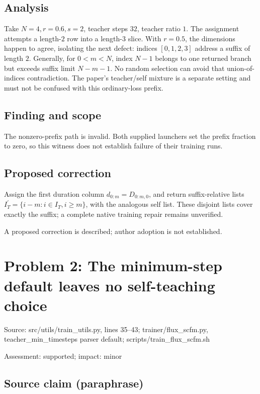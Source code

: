\documentclass[11pt]{article}
\begin{document}
\subsection*{Analysis}

Take \(N=4,r=0.6,s=2\), teacher steps \(32\), teacher ratio \(1\). The assignment attempts a length-\(2\) row into a length-\(3\) slice. With \(r=0.5\), the dimensions happen to agree, isolating the next defect: indices \([0,1,2,3]\) address a suffix of length \(2\). Generally, for \(0<m<N\), index \(N-1\) belongs to one returned branch but exceeds suffix limit \(N-m-1\). No random selection can avoid that union-of-indices contradiction. The paper’s teacher/self mixture is a separate setting and must not be confused with this ordinary-loss prefix.

\subsection*{Finding and scope}

The nonzero-prefix path is invalid. Both supplied launchers set the prefix fraction to zero, so this witness does not establish failure of their training runs.

\subsection*{Proposed correction}

Assign the first duration column \(d_{0:m}=D_{0:m,0}\), and return suffix-relative lists \(I_T^{\prime}=\{i-m:i\in I_T,i\ge m\}\), with the analogous self list. These disjoint lists cover exactly the suffix; a complete native training repair remains unverified.

A proposed correction is described; author adoption is not established.

\section*{Problem 2: The minimum-step default leaves no self-teaching choice}

Source: src/utils/train\_utils.py, lines 35–43; trainer/flux\_scfm.py, teacher\_min\_timesteps parser default; scripts/train\_flux\_scfm.sh

Assessment: supported; impact: minor

\subsection*{Source claim (paraphrase)}
\end{document}

